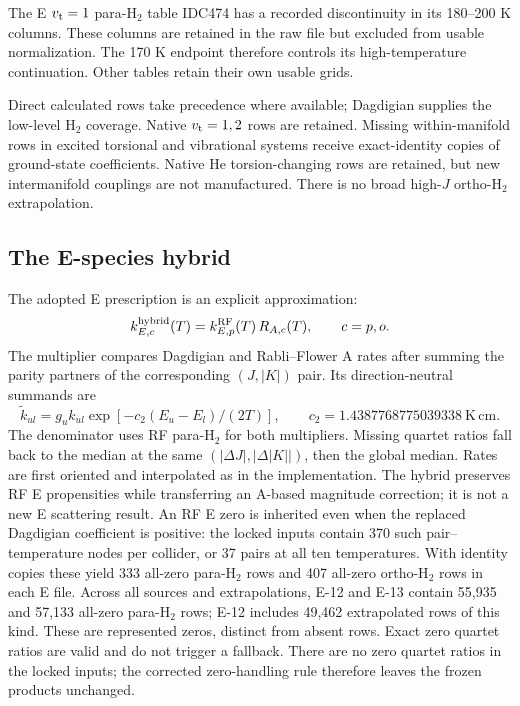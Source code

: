 \documentclass[11pt,a4paper]{article}
\newcommand{\vt}{v_{\rm t}}
\begin{document}
The E $\vt=1$ para-H$_2$ table IDC474 has a recorded discontinuity in its
180--200 K columns. These columns are retained in the raw file but excluded
from usable normalization. The 170 K endpoint therefore controls its
high-temperature continuation. Other tables retain their own usable grids.

Direct calculated rows take precedence where available; Dagdigian supplies
the low-level H$_2$ coverage. Native $\vt=1,2$ rows are retained. Missing
within-manifold rows in excited torsional and vibrational systems receive
exact-identity copies of ground-state coefficients. Native He torsion-changing
rows are retained, but new intermanifold couplings are not manufactured.
There is no broad high-$J$ ortho-H$_2$ extrapolation.

\subsection{The E-species hybrid}
The adopted E prescription is an explicit approximation:
\begin{equation}
k_{E,c}^{\rm hybrid}(T)=k_{E,p}^{\rm RF}(T)\,R_{A,c}(T),
\qquad c=p,o.
\end{equation}
The multiplier compares Dagdigian and Rabli--Flower A rates after summing
the parity partners of the corresponding $(J,|K|)$ pair. Its direction-neutral
summands are
\begin{equation}
\widetilde k_{ul}=g_u k_{ul}
 \exp[-c_2(E_u-E_l)/(2T)],\qquad
c_2=1.4387768775039338\ \mathrm{K\,cm}.
\end{equation}
The denominator uses RF para-H$_2$ for both multipliers. Missing quartet
ratios fall back to the median at the same $(|\Delta J|,|\Delta|K||)$,
then the global median. Rates are first oriented and interpolated as in the
implementation. The hybrid preserves RF E propensities while transferring
an A-based magnitude correction; it is not a new E scattering result.
An RF E zero is inherited even when the replaced Dagdigian coefficient is
positive: the locked inputs contain 370 such pair--temperature nodes per
collider, or 37 pairs at all ten temperatures. With identity copies these yield
333 all-zero para-H$_2$ rows and 407 all-zero ortho-H$_2$ rows in each E file.
Across all sources and extrapolations, E-12 and E-13 contain 55,935 and 57,133
all-zero para-H$_2$ rows; E-12 includes 49,462 extrapolated rows of this kind.
These are represented zeros, distinct from absent rows.
Exact zero quartet ratios are valid and do not trigger a fallback.
There are no zero quartet ratios in the locked inputs; the corrected
zero-handling rule therefore leaves the frozen products unchanged.
\end{document}
